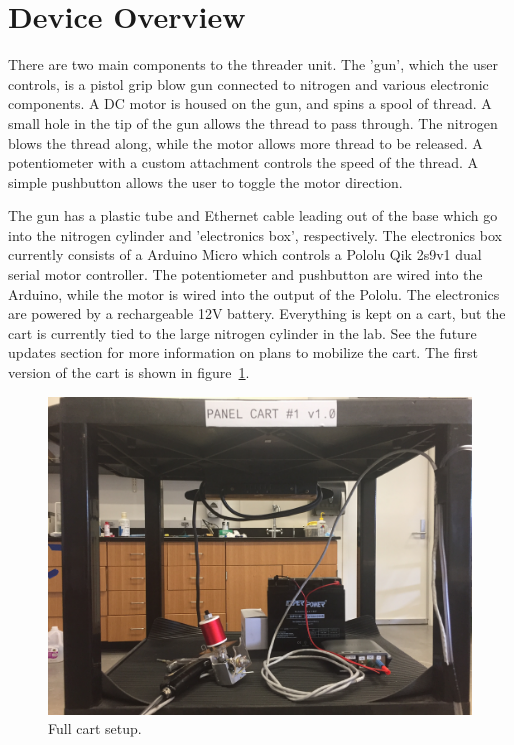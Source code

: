 \documentclass[letterpaper,12pt]{article}
\begin{document}
\section{Device Overview}
There are two main components to the threader unit. The 'gun', which the user controls, is a pistol grip blow gun connected to nitrogen and various electronic components. A DC motor is housed on the gun, and spins a spool of thread. A small hole in the tip of the gun allows the thread to pass through. The nitrogen blows the thread along, while the motor allows more thread to be released. A potentiometer with a custom attachment controls the speed of the thread. A simple pushbutton allows the user to toggle the motor direction. \par
The gun has a plastic tube and Ethernet	 cable leading out of the base which go into the nitrogen cylinder and 'electronics box', respectively. The electronics box currently consists of a Arduino Micro which controls a Pololu Qik 2s9v1 dual serial motor controller. The potentiometer and pushbutton are wired into the Arduino, while the motor is wired into the output of the Pololu. The electronics are powered by a rechargeable 12V battery. Everything is kept on a cart, but the cart is currently tied to the large nitrogen cylinder in the lab. See the future updates section for more information on plans to mobilize the cart. The first version of the cart is shown in figure~\ref{fig:full_cart}.
\begin{figure} [h!]
		\centering
		\includegraphics[width=1\textwidth]{cart_close.JPG}
		\caption{Full cart setup.}
		\label{fig:full_cart}
\end{figure}
\end{document}
